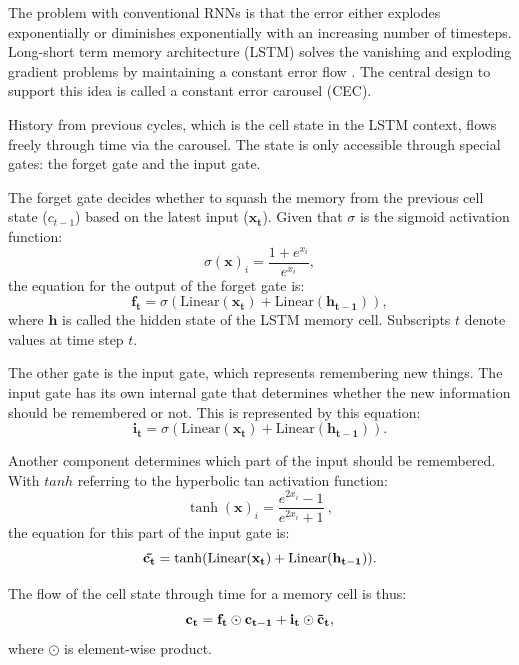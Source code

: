 \documentclass{l4proj}
\begin{document}
The problem with conventional RNNs is that the error either explodes exponentially or diminishes exponentially with an increasing number of timesteps. Long-short term memory architecture (LSTM) solves the vanishing and exploding gradient problems by maintaining a constant error flow \citep{lstm1997}. The central design to support this idea is called a constant error carousel (CEC).

History from previous cycles, which is the cell state in the LSTM context, flows freely through time via the carousel. The state is only accessible through special gates: the forget gate and the input gate.

The forget gate decides whether to squash the memory from the previous cell state ($c_{t-1}$) based on the latest input ($\boldsymbol{x_t}$). Given that $\sigma$ is the sigmoid activation function:
\begin{equation}
    \sigma (\mathbf{x})_i = \frac{1+e^{x_i}}{e^{x_i}},
\end{equation}
the equation for the output of the forget gate is:
\begin{equation}
    \mathbf{f_t} = \sigma(\text{Linear}(\mathbf{x_t}) + \text{Linear}(\mathbf{h_{t-1}})),
\end{equation}
where $\mathbf{h}$ is called the hidden state of the LSTM memory cell. Subscripts $t$ denote values at time step $t$.

The other gate is the input gate, which represents remembering new things. The input gate has its own internal gate that determines whether the new information should be remembered or not. This is represented by this equation:
\begin{equation}
    \mathbf{i_t} = \sigma(\text{Linear}(\mathbf{x_t}) + \text{Linear}(\mathbf{h_{t-1}})).
\end{equation}

Another component determines which part of the input should be remembered. With $tanh$ referring to the hyperbolic tan activation function:
\begin{equation}
    \tanh(\mathbf{x})_i = \frac{e^{2x_i} - 1}{e^{2x_i} + 1}\ ,
\end{equation}
the equation for this part of the input gate is:
\begin{equation}
    \mathbf{\Tilde{c_t}} = \tanh(\text{Linear}(\mathbf{x_t}) + \text{Linear}(\mathbf{h_{t-1}})).
\end{equation}

The flow of the cell state through time for a memory cell is thus:
\begin{equation}
    \mathbf{c_t} = \mathbf{f_t} \odot \mathbf{c_{t-1}} + \mathbf{i_t} \odot \mathbf{\Tilde{c}_t},
\end{equation}
where $\odot$ is element-wise product.
\end{document}
